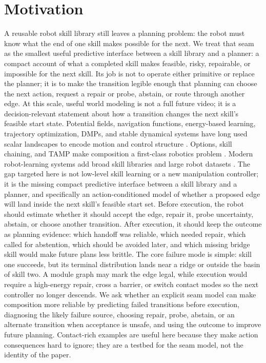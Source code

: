 \documentclass{article}
\begin{document}
\section{Motivation}
A reusable robot skill library still leaves a planning problem: the robot must know what the end of one skill makes possible for the next. We treat that seam as the smallest useful predictive interface between a skill library and a planner: a compact account of what a completed skill makes feasible, risky, repairable, or impossible for the next skill. Its job is not to operate either primitive or replace the planner; it is to make the transition legible enough that planning can choose the next action, request a repair or probe, abstain, or route through another edge. At this scale, useful world modeling is not a full future video; it is a decision-relevant statement about how a transition changes the next skill's feasible start state.
Potential fields, navigation functions, energy-based learning, trajectory optimization, DMPs, and stable dynamical systems have long used scalar landscapes to encode motion and control structure \citep{khatib1986potential,koditschek1989navigation,lecun2006energy,ratliff2009chomp,ijspeert2013dmp,khansari2011stable}. Options, skill chaining, and TAMP make composition a first-class robotics problem \citep{sutton1999options,konidaris2009skillchaining,kaelbling2011tamp,garrett2021integrated}. Modern robot-learning systems add broad skill libraries and large robot datasets \citep{florence2022implicit,brohan2023rt1,openx2023}. The gap targeted here is not low-level skill learning or a new manipulation controller; it is the missing compact predictive interface between a skill library and a planner, and specifically an action-conditioned model of whether a proposed edge will land inside the next skill's feasible start set. Before execution, the robot should estimate whether it should accept the edge, repair it, probe uncertainty, abstain, or choose another transition. After execution, it should keep the outcome as planning evidence: which handoff was reliable, which needed repair, which called for abstention, which should be avoided later, and which missing bridge skill would make future plans less brittle.
The core failure mode is simple: skill one succeeds, but its terminal distribution lands near a ridge or outside the basin of skill two. A module graph may mark the edge legal, while execution would require a high-energy repair, cross a barrier, or switch contact modes so the next controller no longer descends. We ask whether an explicit seam model can make composition more reliable by predicting failed transitions before execution, diagnosing the likely failure source, choosing repair, probe, abstain, or an alternate transition when acceptance is unsafe, and using the outcome to improve future planning. Contact-rich examples are useful here because they make action consequences hard to ignore; they are a testbed for the seam model, not the identity of the paper.
\end{document}
